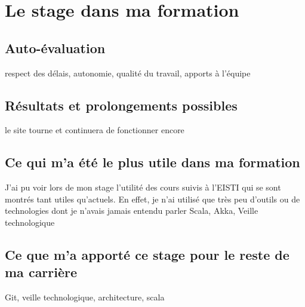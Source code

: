 
\chapter{Le stage dans ma formation} %

\label{formation} %


\section{Auto-évaluation}
respect des délais, autonomie, qualité du travail, apports à l'équipe


\section{Résultats et prolongements possibles}
le site tourne et continuera de fonctionner encore


\section{Ce qui m'a été le plus utile dans ma formation}
J'ai pu voir lors de mon stage l'utilité des cours suivis à l'EISTI qui se sont montrés tant utiles qu'actuels.
En effet, je n'ai utilisé que très peu d'outils ou de technologies dont je n'avais jamais entendu parler
Scala, Akka, Veille technologique


\section{Ce que m'a apporté ce stage pour le reste de ma carrière}
Git, veille technologique, architecture, scala
